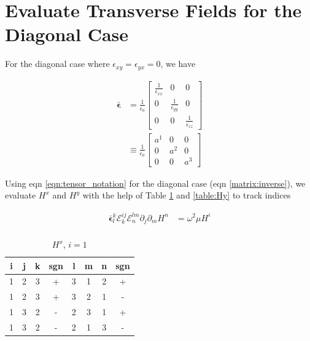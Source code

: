 \documentclass[letter]{article}
\newcommand{\epsilonB}{\boldsymbol{\epsilon}}
\newcommand{\levi}{\mathcal{E}}
\begin{document}
	\section*{Evaluate Transverse Fields for the Diagonal Case}
	For the diagonal case where $\epsilon_{xy} = \epsilon_{yx} = 0$, we have
	
	\begin{align}
		\bar{\epsilonB} &= \frac{1}{\epsilon_0}		
		\begin{bmatrix}
			\frac{1}{\epsilon_{xx}} & 0 & 0 \\[1ex]
			0 & \frac{1}{\epsilon_{yy}} & 0 \\[1ex]
			0 & 0 & \frac{1}{\epsilon_{zz}} 
		\end{bmatrix}  \\
		&\equiv \frac{1}{\epsilon_0}		
		\begin{bmatrix}
			a^1 & 0 & 0 \\[1ex]
			0 & a^2 & 0 \\[1ex]
			0 & 0 & a^3 
		\end{bmatrix}
		\label{matrix:inverse}
	\end{align}
	
	Using eqn \ref{eqn:tensor_notation} for the diagonal case (eqn \ref{matrix:inverse}), we evaluate $H^x$ and $H^y$ with the help of Table \ref{table:Hx} and \ref{table:Hy} to track indices
	
	\begin{align*}
		\bar{\epsilonB}^k_l \levi^{ij}_k \levi^{lm}_n \partial_j \partial_m H^n &= \omega^2 \mu H^i\\[1ex]
	\end{align*}
	
	\begin{table}[h]
	\centering
	\begin{tabular}{|c|c|c|c|c|c|c|c|}
	\hline
	\textbf{i} & \textbf{j} & \textbf{k} & \textbf{sgn} & \textbf{l} & \textbf{m} & \textbf{n} & \textbf{sgn} \\ \hline
	1          & 2          & 3          & +            & 3          & 1          & 2          & +            \\ \hline
	1          & 2          & 3          & +            & 3          & 2          & 1          & -            \\ \hline
	1          & 3          & 2          & -            & 2          & 3          & 1          & +            \\ \hline
	1          & 3          & 2          & -            & 2          & 1          & 3          & -            \\ \hline
	\end{tabular}
	\caption{$H^x$, $i=1$}
	\label{table:Hx}
	\end{table}
	
\end{document}
